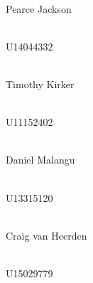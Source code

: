 \begin{titlepage}
\begin{center}
	
		\begin{minipage}{0.4\textwidth}
			\begin{flushleft} \large
				\emph{} \\
				Pearce {Jackson}
			\end{flushleft}
		\end{minipage}
		\begin{minipage}{0.4\textwidth}
			\begin{flushright} \large
				\emph{} \\
				U14044332
			\end{flushright}
		\end{minipage}
		
		
		\begin{minipage}{0.4\textwidth}
			\begin{flushleft} \large
				\emph{} \\
				Timothy {Kirker}
			\end{flushleft}
		\end{minipage}
		\begin{minipage}{0.4\textwidth}
			\begin{flushright} \large
				\emph{} \\
				U11152402
			\end{flushright}
		\end{minipage}
		
		       
		\begin{minipage}{0.4\textwidth}
			\begin{flushleft} \large
				\emph{} \\
				Daniel {Malangu}
			\end{flushleft}
		\end{minipage}
		\begin{minipage}{0.4\textwidth}
			\begin{flushright} \large
				\emph{} \\
				U13315120
			\end{flushright}
		\end{minipage}
		
		\begin{minipage}{0.4\textwidth}
			\begin{flushleft} \large
				\emph{} \\
				Craig {van Heerden}
			\end{flushleft}
		\end{minipage}
		\begin{minipage}{0.4\textwidth}
			\begin{flushright} \large
				\emph{} \\
				U15029779
			\end{flushright}
		\end{minipage}
		
	\end{center}
\end{titlepage}